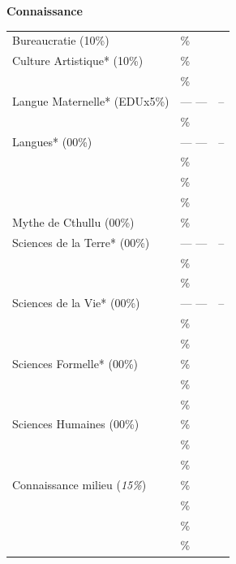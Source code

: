 \documentclass[11pt,twoside,a4paper]{article}
\begin{document}
\begin{multicols}{3}
	\textbf{Connaissance} \hrulefill ~\\  	%
	{\scriptsize \begin{tabular}[c]{ p{4.00cm} p{1.00cm}|c|}
		\cline{3-3}
		Bureaucratie (10\%)		& \dotfill \% & ~ \\
		\cline{3-3}
		Culture Artistique* (10\%)	& \dotfill \% & ~ \\
		\cline{3-3}
		\dotfill			& \dotfill \% & ~ \\
		\cline{3-3}
		Langue Maternelle* (EDUx5\%)	& --- ---     & -- \\
		\cline{3-3}
		\dotfill			& \dotfill \% & ~ \\
		\cline{3-3}
		Langues* (00\%)			& --- ---     & -- \\
		\cline{3-3}
		\dotfill			& \dotfill \% & ~ \\
		\cline{3-3}
		\dotfill			& \dotfill \% & ~ \\
		\cline{3-3}
		\dotfill			& \dotfill \% & ~ \\
		\cline{3-3}
		Mythe de Cthullu (00\%)		& \dotfill \% & ~ \\
		\cline{3-3}
		Sciences de la Terre* (00\%)	& --- ---     & -- \\
		\cline{3-3}
		\dotfill			& \dotfill \% & ~ \\
		\cline{3-3}
		\dotfill			& \dotfill \% & ~ \\
		Sciences de la Vie* (00\%)	& --- ---     & -- \\
		\cline{3-3}
		\dotfill			& \dotfill \% & ~ \\
		\cline{3-3}
		\dotfill			& \dotfill \% & ~ \\
		\cline{3-3}
		Sciences Formelle* (00\%)	& \dotfill \% & ~ \\
		\cline{3-3}
		\dotfill			& \dotfill \% & ~ \\
		\cline{3-3}
		\dotfill			& \dotfill \% & ~ \\
		\cline{3-3}
		Sciences Humaines (00\%)	& \dotfill \% & ~ \\
		\cline{3-3}
		\dotfill			& \dotfill \% & ~ \\
		\cline{3-3}
		\dotfill			& \dotfill \% & ~ \\
		\cline{3-3}
		Connaissance milieu (\emph{15\%})	& \dotfill \% & ~ \\
		\cline{3-3}
		\dotfill			& \dotfill \% & ~ \\
		\cline{3-3}
		\dotfill			& \dotfill \% & ~ \\
		\cline{3-3}
		\dotfill			& \dotfill \% & ~ \\
		\cline{3-3}
	\end{tabular} }~\\
	

\end{multicols}
\end{document}
